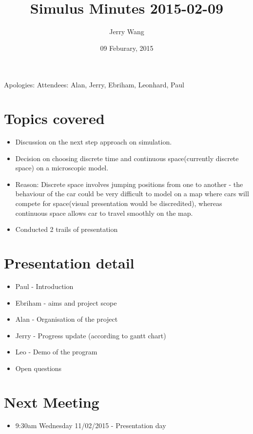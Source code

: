 \documentclass{article}
\author {Jerry Wang}
\title{Simulus Minutes 2015-02-09}
\date {09 Feburary, 2015}
\begin{document}
\maketitle

\noindent Apologies: 
\newline 
Attendees: Alan, Jerry, Ebriham, Leonhard, Paul

\section {Topics covered}
\begin{itemize}
\item  Discussion on the next step approach on simulation.
\item  Decision on choosing discrete time and continuous space(currently discrete space) on a microscopic model.  
\item Reason: Discrete space involves jumping positions from one to another - the behaviour of the car could be very difficult to model on a map where cars will compete for space(visual presentation would be discredited), whereas continuous space allows car to travel smoothly on the map. 

\item Conducted 2 trails of presentation 

\end{itemize}

\section {Presentation detail}

\begin{itemize}
\item Paul -  Introduction 
\item Ebriham - aims and project scope  
\item Alan -  Organisation of the project  
\item Jerry - Progress update (according to gantt chart)
\item Leo -  Demo of the program
\item Open questions

\end{itemize}
\section {Next Meeting}
\begin{itemize}
\item 9:30am Wednesday 11/02/2015 - Presentation day

\end{itemize}
\end{document}
